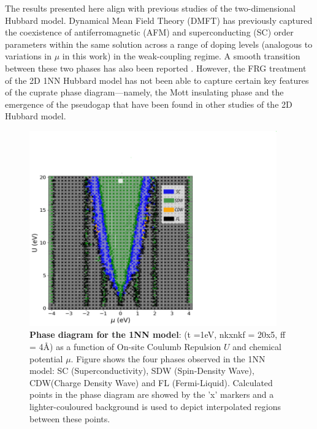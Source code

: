 \documentclass[12pt]{article}
\begin{document}
\medskip

\noindent The results presented here align with previous studies of the two-dimensional Hubbard model. Dynamical Mean Field Theory (DMFT) has 
previously captured the coexistence of antiferromagnetic (AFM) and superconducting (SC) order parameters within the same solution across a range of doping levels (analogous to variations in 
$\mu$ in this work) in the weak-coupling regime. A smooth transition between these two phases has also been reported \cite{capone2006competition}. However, the FRG treatment of the 2D 1NN Hubbard model has not been able to capture certain key features
of the cuprate phase diagram—namely, the Mott insulating phase and the emergence of the pseudogap that have been found in other studies of the 2D Hubbard model\cite{katanin2009comparing,otsuki2014superconductivity}.


\begin{figure}[htbp]  %
    \centering
    \includegraphics[width=0.95\textwidth]{1NNphased.png}  %
    \caption{\textbf{Phase diagram for the 1NN model}:  (t =1eV, nkxnkf = 20x5, ff = 4\AA) as a function of On-site Coulumb Repulsion $U$ and chemical potential $\mu$. 
    Figure shows the four phases observed in the 1NN model: SC (Superconductivity), SDW (Spin-Density Wave), CDW(Charge Density Wave) and FL (Fermi-Liquid).
    Calculated points in the phase diagram are showed by the 'x' markers and a lighter-couloured background is used to depict interpolated regions between these points. }
    \label{fig:1NNpd}
\end{figure}
\end{document}
